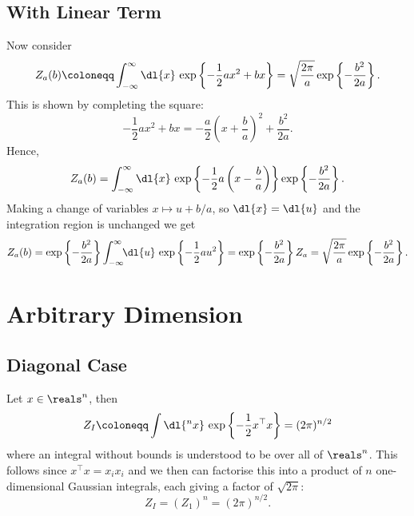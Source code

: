 \documentclass[fleqn]{NotesClass}
\newcommand{\trans}{{\top}}
\begin{document}
    \subsection{With Linear Term}
    Now consider
    \begin{equation}\label{eqn:gaussian 1d with linear term}
        Z_a(b) \coloneqq \int_{-\infty}^{\infty} \dl{x} \, \exp\left\{ -\frac{1}{2}ax^2 + bx \right\} = \sqrt{\frac{2\pi}{a}} \exp\left\{ -\frac{b^2}{2a} \right\}.
    \end{equation}
    This is shown by completing the square:
    \begin{equation}
        -\frac{1}{2}ax^2 + bx = -\frac{a}{2}\left( x + \frac{b}{a} \right)^2 + \frac{b^2}{2a}.
    \end{equation}
    Hence,
    \begin{equation}
        Z_a(b) = \int_{-\infty}^{\infty} \dl{x} \, \exp\left\{ -\frac{1}{2}a\left( x - \frac{b}{a} \right) \right\} \exp\left\{ -\frac{b^2}{2a} \right\}.
    \end{equation}
    Making a change of variables \(x \mapsto u + b/a\), so \(\dl{x} = \dl{u}\) and the integration region is unchanged we get
    \begin{equation*}
        Z_a(b) = \exp\left\{ -\frac{b^2}{2a} \right\} \int_{-\infty}^{\infty} \!\! \dl{u} \, \exp\left\{ -\frac{1}{2}au^2 \right\} = \exp\left\{ -\frac{b^2}{2a} \right\} Z_a = \sqrt{\frac{2\pi}{a}} \exp\left\{ -\frac{b^2}{2a} \right\}.
    \end{equation*}
    
    \section{Arbitrary Dimension}
    \subsection{Diagonal Case}
    Let \(x \in \reals^n\), then
    \begin{equation}
        Z_I \coloneqq \int \dl{^nx} \, \exp\left\{ -\frac{1}{2}x^\trans x \right\} = (2\pi)^{n/2}
    \end{equation}
    where an integral without bounds is understood to be over all of \(\reals^n\).
    This follows since \(x^\trans x = x_ix_i\) and we then can factorise this into a product of \(n\) one-dimensional Gaussian integrals, each giving a factor of \(\sqrt{2\pi}\):
    \begin{equation}
        Z_I = (Z_1)^n = (2\pi)^{n/2}.
    \end{equation}
    
\end{document}
